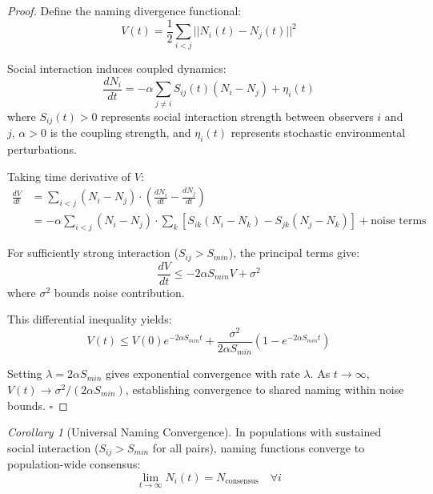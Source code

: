 \documentclass[12pt]{article}
\newtheorem{corollary}[theorem]{Corollary}
\theoremstyle{definition}
\theoremstyle{remark}
\newtheorem{corollary}[theorem]{Corollary}
\begin{document}
\begin{proof}
Define the naming divergence functional:
\begin{equation}
V(t) = \frac{1}{2}\sum_{i<j} ||N_i(t) - N_j(t)||^2
\end{equation}

Social interaction induces coupled dynamics:
\begin{equation}
\frac{dN_i}{dt} = -\alpha \sum_{j \neq i} S_{ij}(t)(N_i - N_j) + \eta_i(t)
\end{equation}
where $S_{ij}(t) > 0$ represents social interaction strength between observers $i$ and $j$, $\alpha > 0$ is the coupling strength, and $\eta_i(t)$ represents stochastic environmental perturbations.

Taking time derivative of $V$:
\begin{align}
\frac{dV}{dt} &= \sum_{i<j} (N_i - N_j) \cdot \left(\frac{dN_i}{dt} - \frac{dN_j}{dt}\right) \\
&= -\alpha \sum_{i<j} (N_i - N_j) \cdot \sum_{k} [S_{ik}(N_i - N_k) - S_{jk}(N_j - N_k)] + \text{noise terms}
\end{align}

For sufficiently strong interaction ($S_{ij} > S_{min}$), the principal terms give:
\begin{equation}
\frac{dV}{dt} \leq -2\alpha S_{min} V + \sigma^2
\end{equation}
where $\sigma^2$ bounds noise contribution.

This differential inequality yields:
\begin{equation}
V(t) \leq V(0) e^{-2\alpha S_{min} t} + \frac{\sigma^2}{2\alpha S_{min}}(1 - e^{-2\alpha S_{min} t})
\end{equation}

Setting $\lambda = 2\alpha S_{min}$ gives exponential convergence with rate $\lambda$. As $t \rightarrow \infty$, $V(t) \rightarrow \sigma^2/(2\alpha S_{min})$, establishing convergence to shared naming within noise bounds. $\square$
\end{proof}

\begin{corollary}[Universal Naming Convergence]
In populations with sustained social interaction ($S_{ij} > S_{min}$ for all pairs), naming functions converge to population-wide consensus:
\begin{equation}
\lim_{t \to \infty} N_i(t) = N_{\text{consensus}} \quad \forall i
\end{equation}
\end{corollary}
\end{document}
